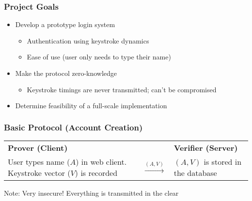 \documentclass{beamer}
\begin{document}
\frame
{
  \frametitle{Project Goals}

  \begin{itemize}
  \item<1-> Develop a prototype login system
    \begin{itemize}
    \item<2-> Authentication using keystroke dynamics
    \item<3-> Ease of use (user only needs to type their name)
    \end{itemize}
  \item<4-> Make the protocol zero-knowledge
    \begin{itemize}
    \item<5-> Keystroke timings are never transmitted; can't be compromised
    \end{itemize}
  \item<6-> Determine feasibility of a full-scale implementation
  \end{itemize}
}


\frame
{
  \frametitle{Basic Protocol (Account Creation)}

  \begin{center}
\begin{tabular}{m{1.5in}cm{1.5in}}
\textbf{Prover (Client)} && \textbf{Verifier (Server)}\\
User types name ($A$) in web client. Keystroke vector ($V$) is recorded &$\xrightarrow{(A, V)}$ & $(A,V)$ is stored in the database
\end{tabular}
\end{center}
\vspace{1in}
Note: Very insecure! Everything is transmitted in the clear

}
\end{document}
